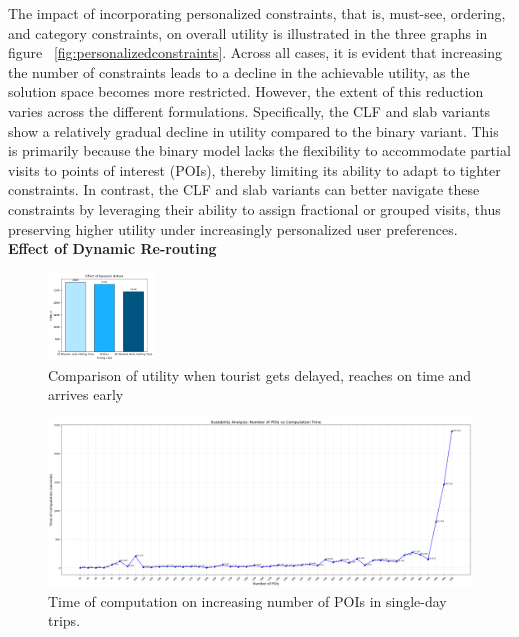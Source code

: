 The impact of incorporating personalized constraints, that is, must-see, ordering, and category constraints, on overall utility is illustrated in the three graphs in figure ~\ref{fig:personalizedconstraints}. Across all cases, it is evident that increasing the number of constraints leads to a decline in the achievable utility, as the solution space becomes more restricted. However, the extent of this reduction varies across the different formulations. Specifically, the CLF and slab variants show a relatively gradual decline in utility compared to the binary variant. This is primarily because the binary model lacks the flexibility to accommodate partial visits to points of interest (POIs), thereby limiting its ability to adapt to tighter constraints. In contrast, the CLF and slab variants can better navigate these constraints by leveraging their ability to assign fractional or grouped visits, thus preserving higher utility under increasingly personalized user preferences.\\

\noindent\textbf{Effect of Dynamic Re-routing}
\begin{figure}[H]
    \centering
    \includegraphics[width=0.25\textwidth]{plots/dynamic.png}
    \caption{Comparison of utility when tourist gets delayed, reaches on time and arrives early}
    \label{fig:dynamic}
\end{figure}

\begin{figure}[htbp]
    \centering
    \includegraphics[width=\textwidth]{plots/scalability.png}
    \caption{Time of computation on increasing number of POIs in single-day trips.}
    \label{fig:scalability1}
\end{figure}

